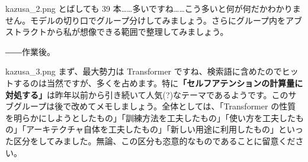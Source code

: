 \documentclass[b5paper,xelatex,ja=standard,10pt]{bxjsarticle}
\begin{document}
\begin{SERIFU}[colback=PaleIris, colbacktitle=PaleIris2]{kazusa_2.png}
とばしても 39 本……多いですね……こう多いと何が何だかわかりません。モデルの切り口でグループ分けしてみましょう。さらにグループ内をアブストラクトから私が想像できる範囲で整理してみましょう。
\end{SERIFU}
\vspace{1pt}
\centerline{――作業後。}

\begin{SERIFU}[colback=PaleIris, colbacktitle=PaleIris2]{kazusa_3.png}
まず、最大勢力は Transformer ですね、検索語に含めたのでヒットするのは当然ですが、多くを占めます。特に\textbf{「セルフアテンションの計算量に対処する」}は昨年以前から引き続いて人気(?)なテーマであるようです。このサブグループは後で改めてメモしましょう。全体としては、「Transformer の性質を明らかにしようとしたもの」「訓練方法を工夫したもの」「使い方を工夫したもの」「アーキテクチャ自体を工夫したもの」「新しい用途に利用したもの」といった区分をしてみました。無論、この区分も恣意的なものであることに留意ください。
\end{SERIFU}
\end{document}
